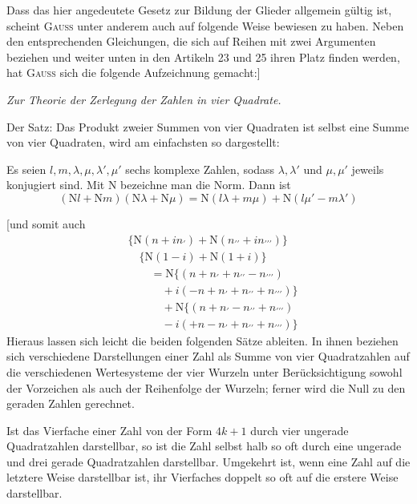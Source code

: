 %
Dass das hier angedeutete Gesetz zur Bildung der Glieder allgemein gültig ist, scheint \textsc{Gauss} unter anderem auch auf folgende Weise bewiesen zu haben. Neben den entsprechenden Gleichungen, die sich auf Reihen mit zwei Argumenten beziehen und weiter unten in den Artikeln 23 und 25 ihren Platz finden werden, hat \textsc{Gauss} sich die folgende Aufzeichnung gemacht:]

\begingroup\itshape
Zur Theorie der Zerlegung der Zahlen in vier Quadrate.

Der Satz: Das Produkt zweier Summen von vier Quadraten ist selbst eine Summe von vier Quadraten, wird am einfachsten so dargestellt:

Es seien $l,m,\lambda,\mu,\lambda',\mu'$ sechs komplexe Zahlen, sodass $\lambda,\lambda'$ und $\mu,\mu'$ jeweils konjugiert sind.
Mit $\mathrm N$ bezeichne man die Norm. Dann ist
\[
(\mathrm Nl+\mathrm Nm)(\mathrm N\lambda+\mathrm N\mu)
=\mathrm N(l\lambda+m\mu)+\mathrm N(l\mu'-m\lambda')
\]
\par\endgroup
{}
[und somit auch
\[
\begin{aligned}
&\{\mathrm N(n+in_{\prime})+\mathrm N(n_{\prime\prime}+in_{\prime\prime\prime})\}
\\&\quad\{\mathrm N(1-i)+\mathrm N(1+i)\}\\
&\qquad=\mathrm N\{(n+n_{\prime}+n_{\prime\prime}-n_{\prime\prime\prime})
\\&\qquad\quad+i(-n+n_{\prime}+n_{\prime\prime}+n_{\prime\prime\prime})\}\\
&\qquad\quad+\mathrm N\{(n+n_{\prime}-n_{\prime\prime}+n_{\prime\prime\prime})
\\&\qquad\quad-i(+n-n_{\prime}+n_{\prime\prime}+n_{\prime\prime\prime})\}
\end{aligned}
\]
Hieraus lassen sich leicht die beiden folgenden Sätze ableiten. In ihnen beziehen sich verschiedene Darstellungen einer Zahl als Summe von vier Quadratzahlen auf die verschiedenen Wertesysteme der vier Wurzeln unter Berücksichtigung sowohl der Vorzeichen als auch der Reihenfolge der Wurzeln; ferner wird die Null zu den geraden Zahlen gerechnet.

Ist das Vierfache einer Zahl von der Form $4k+1$ durch vier ungerade Quadratzahlen darstellbar, so ist die Zahl selbst halb so oft durch eine ungerade und drei gerade Quadratzahlen darstellbar. Umgekehrt ist, wenn eine Zahl auf die letztere Weise darstellbar ist, ihr Vierfaches doppelt so oft auf die erstere Weise darstellbar.

